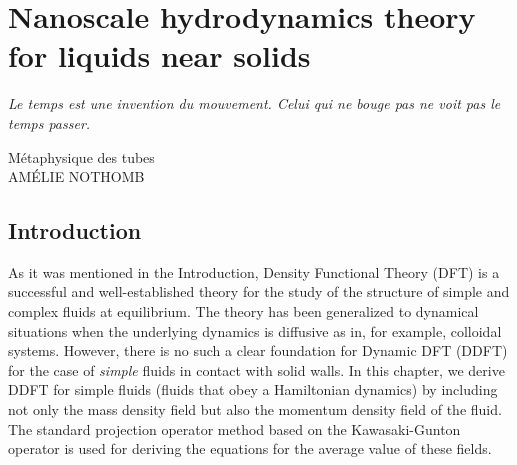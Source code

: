 \documentclass[b5paper,openright,10pt]{book}
\begin{document}


\chapter{Nanoscale hydrodynamics theory for liquids near solids}\label{Chap:Theory}
\epigraph{\textit{Le temps est une invention du mouvement. Celui qui ne bouge pas ne voit pas le temps passer.}}{Métaphysique des tubes \\ AMÉLIE NOTHOMB}


\section{Introduction}
As it was mentioned in the Introduction, Density Functional Theory (DFT) is a successful and well-established theory for the study of the structure of simple and complex fluids at equilibrium. The theory has been generalized to dynamical situations when the underlying dynamics is diffusive as in, for example, colloidal systems. However, there is no such a clear foundation for Dynamic DFT (DDFT) for the case of \textit{simple} fluids in contact with solid walls. 
In this chapter, we derive DDFT for simple fluids (fluids that obey  a Hamiltonian dynamics) by including not only the mass density field but also the momentum density field of the fluid. The standard projection operator method based on the Kawasaki-Gunton operator is used for deriving the equations for the average value of these fields. 
\end{document}
